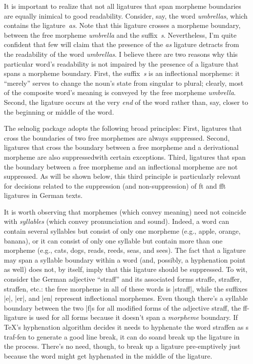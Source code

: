 \documentclass[11pt]{article}
\newcommand{\pkg}[1]{\textsf{#1}}
\begin{document}
It is important to realize that not all ligatures that span morpheme boundaries are equally inimical to good readability. Consider, say, the word \emph{umbrellas}, which contains the ligature~\emph{as}. Note that this ligature crosses a morpheme boundary, between the free morpheme \emph{umbrella} and the suffix~\emph{s}. Nevertheless, I'm quite confident that few will claim that the presence of the \emph{as} ligature detracts from the readability of the word \emph{umbrellas}. I believe there are two reasons why this particular word's readability is not impaired by the presence of a ligature that spans a morpheme boundary. First, the suffix~\emph{s} is an inflectional morpheme: it \enquote{merely} serves to change the noun's state from singular to plural; clearly, most of the composite word's meaning is conveyed by the free morpheme \emph{umbrella}. Second, the ligature occurs at the very \emph{end} of the word rather than, say, closer to the beginning or middle of the word.

The \pkg{selnolig} package adopts the following broad principles: First, ligatures that cross the boundaries of two free morphemes are always suppressed. Second, ligatures that cross the boundary between a free morpheme and a derivational morpheme are also suppressed\textemdash with certain exceptions. Third, ligatures that span the boundary between a free morpheme and an inflectional morpheme are not suppressed. As will be shown below, this third principle is particularly relevant for decisions related to the suppression (and non-suppression) of ft and fft ligatures in German texts.

It is worth observing that morphemes (which convey meaning) need not coincide with \emph{syllables} (which convey pronunciation and sound). Indeed, a word can contain several syllables but consist of only one morpheme (e.g., apple, orange, banana), or it can consist of only one syllable but contain more than one morpheme (e.g., cats, dogs, reads, reeds, seas, and sees). The fact that a ligature may span a syllable boundary within a word (and, possibly, a hyphenation point as well) does not, by itself, imply that this ligature should be suppressed. To wit, consider the German adjective \enquote{straff} and its associated forms straffe, straffer, straffen, etc.: the free morpheme in all of these words is |straff|, while the suffixes |e|, |er|, and |en| represent inflectional morphemes. Even though there's a syllable boundary between the two |f|s for all modified forms of the adjective straff, the ff-ligature is used for all forms because it doesn't span a \emph{morpheme} boundary. If TeX's hyphenation algorithm decides it needs to hyphenate the word straffen as s\kern0pt traf-fen to generate a good line break, it can do so\textemdash and break up the ligature in the process. There's no need, though, to break up a ligature pre-emptively just because the word might get hyphenated in the middle of the ligature.
\end{document}
